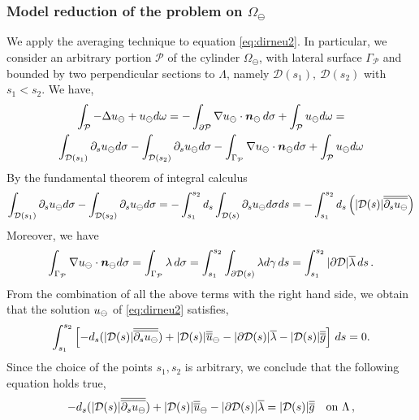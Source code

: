 \subsubsection*{Model reduction of the problem on $\Omega_{\ominus}$}

We apply the averaging technique to equation \eqref{eq:dirneu2}. In particular, we consider an arbitrary portion $\mathcal{P}$ of the cylinder $\Omega_\ominus$, with lateral surface $\Gamma _{\mathcal{P}}$ and bounded by two perpendicular sections to $\Lambda$, namely $\mathcal{D}(s_1), \ \mathcal{D}(s_2)$ with $s_1<s_2$. We have,
\begin{multline*}
\int_{\mathcal{P}} -\Delta u_{\ominus} + u_{\ominus} d\omega =
-\int_{\partial \mathcal{P}} \nabla u_{\ominus} \cdot \boldsymbol n_{\ominus} \, d\sigma  + \int_{\mathcal{P}}u_{\ominus} d\omega=
\\
 \int_{\mathcal{D}(s_1)} \partial_s u_{\ominus} d\sigma -  \int_{\mathcal{D}(s_2)} \partial_s u_{\ominus} d\sigma -  \int_{\Gamma_{\mathcal{P}}} \nabla u_{\ominus} \cdot \boldsymbol n_{\ominus} d\sigma +\int_{\mathcal{P}}u_{\ominus} d\omega
\end{multline*}
By the fundamental theorem of integral calculus 
\begin{equation*}
\int_{\mathcal{D}(s_1)} \partial_s u_{\ominus} d\sigma -  \int_{\mathcal{D}(s_2)} \partial_s u_{\ominus} d\sigma 
= -\int_{s_1}^{s_2} d_s \int_{\mathcal{D}(s)}  \partial_s u_{\ominus} d\sigma ds
= -\int_{s_1}^{s_2} d_s \left( |\mathcal{D}(s)| \overline{\overline{\partial_s u_{\ominus}}} \right)
\end{equation*}
Moreover, we have
\begin{equation*}
\int_{\Gamma_{\mathcal{P}}} \nabla u_{\ominus} \cdot \boldsymbol n_{\ominus} d\sigma =  \int_{\Gamma_{\mathcal{P}}} \lambda \, d\sigma
=  \int_{s_1}^{s_2} \int_{\partial\mathcal{D}(s)} \lambda d\gamma \, ds 
= \int_{s_1}^{s_2} |\partial\mathcal{D}| \overline{\lambda} \,ds\,.
\end{equation*}
From the combination of all the above terms with the right hand side, we obtain that the solution $u_{\ominus}$ of \eqref{eq:dirneu2} satisfies,
\begin{equation*}
\int_{s_1}^{s_2} \left[ 
-d_s (|\mathcal{D}(s)|\overline{\overline{\partial_s u_{\ominus}}}) + |\mathcal{D}(s)|\overline{\overline{u}}_{\ominus} 
- |\partial\mathcal{D}(s)| \overline{\lambda} - |\mathcal{D}(s)| \overline{\overline{g}}
\right]\, ds = 0.
\end{equation*}
Since the choice of the points $s_1,s_2$ is arbitrary, we conclude that the following equation holds true,
\begin{equation}\label{eq:averaged_f}
-d_s (|\D(s)|\avrd{\partial_s \uf}) + |\D(s)|\avrd{u}_{\ominus} 
- |\partial\mathcal{D}(s)| \avrc{\lambda}
= |\mathcal{D}(s)| \avrd{g} \quad \text{on} \ \Lambda\,,
\end{equation}
